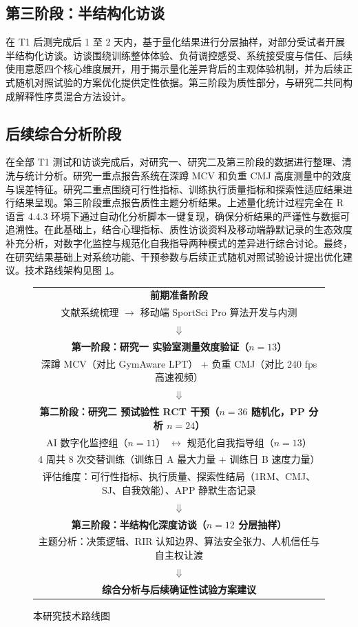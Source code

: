 \documentclass[UTF8,zihao=-4,twoside,openany]{ctexbook}
\begin{document}
\subsection{第三阶段：半结构化访谈}
在 T1 后测完成后 1 至 2 天内，基于量化结果进行分层抽样，对部分受试者开展半结构化访谈。访谈围绕训练整体体验、负荷调控感受、系统接受度与信任、后续使用意愿四个核心维度展开，用于揭示量化差异背后的主观体验机制，并为后续正式随机对照试验的方案优化提供定性依据。第三阶段为质性部分，与研究二共同构成解释性序贯混合方法设计。

\subsection{后续综合分析阶段}
在全部 T1 测试和访谈完成后，对研究一、研究二及第三阶段的数据进行整理、清洗与统计分析。研究一重点报告系统在深蹲 MCV 和负重 CMJ 高度测量中的效度与误差特征。研究二重点围绕可行性指标、训练执行质量指标和探索性适应结果进行结果呈现。第三阶段重点报告质性主题分析结果。上述量化统计过程完全在 R 语言 4.4.3 环境下通过自动化分析脚本一键复现，确保分析结果的严谨性与数据可追溯性。在此基础上，结合心理指标、质性访谈资料及移动端静默记录的生态效度补充分析，对数字化监控与规范化自我指导两种模式的差异进行综合讨论。最终，在研究结果基础上对系统功能、干预参数与后续正式随机对照试验设计提出优化建议。技术路线架构见图 \ref{fig:ch3-tech-route}。

\begin{figure}[htbp]
  \centering
  \small
  \begin{tabular}{|c|}
    \hline
    \textbf{前期准备阶段} \\
    文献系统梳理 \quad $\longrightarrow$ \quad 移动端 SportSci Pro 算法开发与内测 \\
    $\Downarrow$ \\
    \textbf{第一阶段：研究一 实验室测量效度验证（$n=13$）} \\
    深蹲 MCV（对比 GymAware LPT） \quad + \quad 负重 CMJ（对比 240 fps 高速视频） \\
    $\Downarrow$ \\
    \textbf{第二阶段：研究二 预试验性 RCT 干预（$n=36$ 随机化，PP 分析 $n=24$）} \\
    AI 数字化监控组（$n=11$） \quad $\longleftrightarrow$ \quad 规范化自我指导组（$n=13$） \\
    4 周共 8 次交替训练（训练日 A 最大力量 + 训练日 B 速度力量） \\
    评估维度：可行性指标、执行质量、探索性结局（1RM、CMJ、SJ、自我效能）、APP 静默生态记录 \\
    $\Downarrow$ \\
    \textbf{第三阶段：半结构化深度访谈（$n=12$ 分层抽样）} \\
    主题分析：决策逻辑、RIR 认知边界、算法安全张力、人机信任与自主权让渡 \\
    $\Downarrow$ \\
    \textbf{综合分析与后续确证性试验方案建议} \\
    \hline
  \end{tabular}
  \vspace{6pt}
  \caption{本研究技术路线图}
  \label{fig:ch3-tech-route}
\end{figure}
\end{document}
